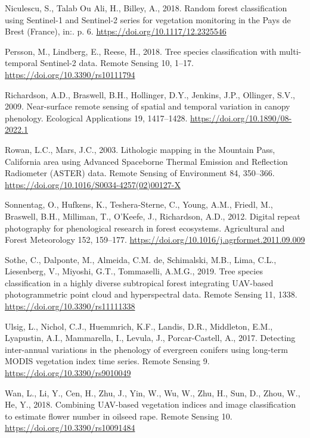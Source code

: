 \documentclass[]{article}
\begin{document}
\leavevmode\hypertarget{ref-Niculescu2018}{}%
Niculescu, S., Talab Ou Ali, H., Billey, A., 2018. Random forest
classification using Sentinel-1 and Sentinel-2 series for vegetation
monitoring in the Pays de Brest (France), in:. p. 6.
\url{https://doi.org/10.1117/12.2325546}

\leavevmode\hypertarget{ref-Persson2018}{}%
Persson, M., Lindberg, E., Reese, H., 2018. Tree species classification
with multi-temporal Sentinel-2 data. Remote Sensing 10, 1--17.
\url{https://doi.org/10.3390/rs10111794}

\leavevmode\hypertarget{ref-Richardson2009}{}%
Richardson, A.D., Braswell, B.H., Hollinger, D.Y., Jenkins, J.P.,
Ollinger, S.V., 2009. Near-surface remote sensing of spatial and
temporal variation in canopy phenology. Ecological Applications 19,
1417--1428. \url{https://doi.org/10.1890/08-2022.1}

\leavevmode\hypertarget{ref-Rowan2003}{}%
Rowan, L.C., Mars, J.C., 2003. Lithologic mapping in the Mountain Pass,
California area using Advanced Spaceborne Thermal Emission and
Reflection Radiometer (ASTER) data. Remote Sensing of Environment 84,
350--366. \url{https://doi.org/10.1016/S0034-4257(02)00127-X}

\leavevmode\hypertarget{ref-Sonnentag2012}{}%
Sonnentag, O., Hufkens, K., Teshera-Sterne, C., Young, A.M., Friedl, M.,
Braswell, B.H., Milliman, T., O'Keefe, J., Richardson, A.D., 2012.
Digital repeat photography for phenological research in forest
ecosystems. Agricultural and Forest Meteorology 152, 159--177.
\url{https://doi.org/10.1016/j.agrformet.2011.09.009}

\leavevmode\hypertarget{ref-Sothe2019a}{}%
Sothe, C., Dalponte, M., Almeida, C.M. de, Schimalski, M.B., Lima, C.L.,
Liesenberg, V., Miyoshi, G.T., Tommaselli, A.M.G., 2019. Tree species
classification in a highly diverse subtropical forest integrating
UAV-based photogrammetric point cloud and hyperspectral data. Remote
Sensing 11, 1338. \url{https://doi.org/10.3390/rs11111338}

\leavevmode\hypertarget{ref-Ulsig2017a}{}%
Ulsig, L., Nichol, C.J., Huemmrich, K.F., Landis, D.R., Middleton, E.M.,
Lyapustin, A.I., Mammarella, I., Levula, J., Porcar-Castell, A., 2017.
Detecting inter-annual variations in the phenology of evergreen conifers
using long-term MODIS vegetation index time series. Remote Sensing 9.
\url{https://doi.org/10.3390/rs9010049}

\leavevmode\hypertarget{ref-Wan2018}{}%
Wan, L., Li, Y., Cen, H., Zhu, J., Yin, W., Wu, W., Zhu, H., Sun, D.,
Zhou, W., He, Y., 2018. Combining UAV-based vegetation indices and image
classification to estimate flower number in oilseed rape. Remote Sensing
10. \url{https://doi.org/10.3390/rs10091484}
\end{document}
